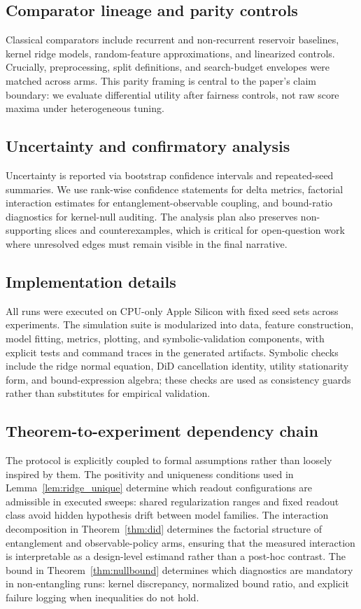 \subsection{Comparator lineage and parity controls}
Classical comparators include recurrent and non-recurrent reservoir baselines, kernel ridge models, random-feature approximations, and linearized controls. Crucially, preprocessing, split definitions, and search-budget envelopes were matched across arms. This parity framing is central to the paper's claim boundary: we evaluate differential utility after fairness controls, not raw score maxima under heterogeneous tuning.

\subsection{Uncertainty and confirmatory analysis}
Uncertainty is reported via bootstrap confidence intervals and repeated-seed summaries. We use rank-wise confidence statements for delta metrics, factorial interaction estimates for entanglement-observable coupling, and bound-ratio diagnostics for kernel-null auditing. The analysis plan also preserves non-supporting slices and counterexamples, which is critical for open-question work where unresolved edges must remain visible in the final narrative.

\subsection{Implementation details}
All runs were executed on CPU-only Apple Silicon with fixed seed sets across experiments. The simulation suite is modularized into data, feature construction, model fitting, metrics, plotting, and symbolic-validation components, with explicit tests and command traces in the generated artifacts. Symbolic checks include the ridge normal equation, DiD cancellation identity, utility stationarity form, and bound-expression algebra; these checks are used as consistency guards rather than substitutes for empirical validation.

\subsection{Theorem-to-experiment dependency chain}
The protocol is explicitly coupled to formal assumptions rather than loosely inspired by them. The positivity and uniqueness conditions used in Lemma~\ref{lem:ridge_unique} determine which readout configurations are admissible in executed sweeps: shared regularization ranges and fixed readout class avoid hidden hypothesis drift between model families. The interaction decomposition in Theorem~\ref{thm:did} determines the factorial structure of entanglement and observable-policy arms, ensuring that the measured interaction is interpretable as a design-level estimand rather than a post-hoc contrast. The bound in Theorem~\ref{thm:nullbound} determines which diagnostics are mandatory in non-entangling runs: kernel discrepancy, normalized bound ratio, and explicit failure logging when inequalities do not hold.

